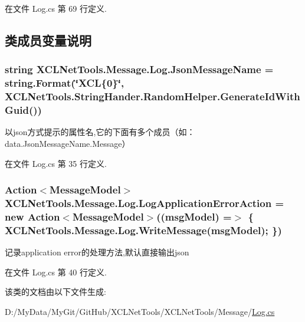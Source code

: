 在文件 Log.\-cs 第 69 行定义.



\subsection{类成员变量说明}
\hypertarget{class_x_c_l_net_tools_1_1_message_1_1_log_ac9218999b3da2b5fbd7476e1ae47ca71}{
\subsubsection[{Json\-Message\-Name}]{\setlength{\rightskip}{0pt plus 5cm}string X\-C\-L\-Net\-Tools.\-Message.\-Log.\-Json\-Message\-Name = string.\-Format(\char`\"{}X\-C\-L\{0\}\char`\"{}, X\-C\-L\-Net\-Tools.\-String\-Hander.\-Random\-Helper.\-Generate\-Id\-With\-Guid())\hspace{0.3cm}{\ttfamily [static]}}}\label{class_x_c_l_net_tools_1_1_message_1_1_log_ac9218999b3da2b5fbd7476e1ae47ca71}


以json方式提示的属性名,它的下面有多个成员（如：data.\-Json\-Message\-Name.\-Message） 



在文件 Log.\-cs 第 35 行定义.

\hypertarget{class_x_c_l_net_tools_1_1_message_1_1_log_aeb571cf7294cbdc7776e44c5654b28d4}{
\subsubsection[{Log\-Application\-Error\-Action}]{\setlength{\rightskip}{0pt plus 5cm}Action$<${\bf Message\-Model}$>$ X\-C\-L\-Net\-Tools.\-Message.\-Log.\-Log\-Application\-Error\-Action = new Action$<${\bf Message\-Model}$>$((msg\-Model) =$>$ \{ {\bf X\-C\-L\-Net\-Tools.\-Message.\-Log.\-Write\-Message}(msg\-Model); \})\hspace{0.3cm}{\ttfamily [static]}}}\label{class_x_c_l_net_tools_1_1_message_1_1_log_aeb571cf7294cbdc7776e44c5654b28d4}


记录application error的处理方法,默认直接输出json 



在文件 Log.\-cs 第 40 行定义.



该类的文档由以下文件生成\-:\begin{DoxyCompactItemize}
\item 
D\-:/\-My\-Data/\-My\-Git/\-Git\-Hub/\-X\-C\-L\-Net\-Tools/\-X\-C\-L\-Net\-Tools/\-Message/\hyperlink{_log_8cs}{Log.\-cs}\end{DoxyCompactItemize}
